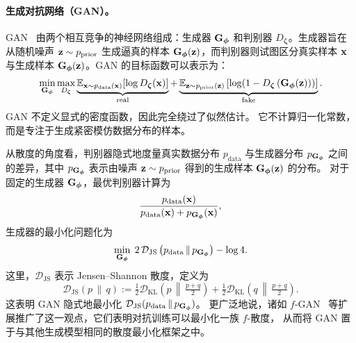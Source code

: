 \paragraph{生成对抗网络（GAN）。}
GAN~\citep{goodfellow2014generative} 由两个相互竞争的神经网络组成：生成器 $ {\mathbf{G}}_{\bm{\phi}} $ 和判别器 $ D_{\bm{\zeta}} $。生成器旨在从随机噪声 $ {\mathbf{z}} \sim p_{\mathrm{prior}}$ 生成逼真的样本 $ {\mathbf{G}}_{\bm{\phi}}({\mathbf{z}}) $，而判别器则试图区分真实样本 $ {\mathbf{x}} $ 与生成样本 $ {\mathbf{G}}_{\bm{\phi}}({\mathbf{z}}) $。GAN 的目标函数可以表示为：
\begin{equation*}
    \min_{{\mathbf{G}}_{\bm{\phi}}} \max_{D_{\bm{\zeta}}} \underbrace{\mathbb{E}_{{\mathbf{x}} \sim p_{\mathrm{data}}({\mathbf{x}})}[\log D_{\bm{\zeta}}({\mathbf{x}})]}_{\text{real}} + \underbrace{\mathbb{E}_{{\mathbf{z}} \sim p_{\mathrm{prior}}({\mathbf{z}})}\left[\log(1 - D_{\bm{\zeta}}\left({\mathbf{G}}_{\bm{\phi}}({\mathbf{z}}))\right)\right]}_{\text{fake}}.
\end{equation*}
GAN 不定义显式的密度函数，因此完全绕过了似然估计。
它不计算归一化常数，而是专注于生成紧密模仿数据分布的样本。

从散度的角度看，判别器隐式地度量真实数据分布 $p_{\mathrm{data}}$
与生成器分布 $p_{{\mathbf{G}}_{{\bm{\phi}}}}$ 之间的差异，其中 $p_{{\mathbf{G}}_{{\bm{\phi}}}}$ 表示由噪声 ${\mathbf{z}} \sim p_{\mathrm{prior}}$ 得到的生成样本 ${\mathbf{G}}_{{\bm{\phi}}}({\mathbf{z}})$ 的分布。
对于固定的生成器 ${\mathbf{G}}_{{\bm{\phi}}}$，最优判别器计算为
\begin{equation*}
     \frac{p_{\mathrm{data}}({\mathbf{x}})}{p_{\mathrm{data}}({\mathbf{x}}) + p_{{\mathbf{G}}_{{\bm{\phi}}}}({\mathbf{x}})},
\end{equation*}
生成器的最小化问题化为
\begin{equation*}
    \min_{{\mathbf{G}}_{{\bm{\phi}}}} \; 2\,\mathcal{D}_\mathrm{JS} \left(p_{\mathrm{data}} \,\|\, p_{{\mathbf{G}}_{\bm{\phi}}}\right) - \log 4.
\end{equation*}
这里，$\mathcal{D}_\mathrm{JS}$ 表示 Jensen–Shannon 散度，定义为
\begin{equation*}
    \mathcal{D}_\mathrm{JS}(p \,\|\, q) 
    := \tfrac{1}{2} \mathcal{D}_\mathrm{KL} \left(p \,\middle\|\, \tfrac{p+q}{2}\right) 
    + \tfrac{1}{2} \mathcal{D}_\mathrm{KL} \left(q \,\middle\|\, \tfrac{p+q}{2}\right).
\end{equation*}
这表明 GAN 隐式地最小化 $\mathcal{D}_\mathrm{JS}(p_{\mathrm{data}} \,\|\, p_{{\mathbf{G}}_{\bm{\phi}}})$。
更广泛地说，诸如 $f$-GAN~\citep{nowozin2016f} 等扩展推广了这一观点，它们表明对抗训练可以最小化一族 $f$-散度，
从而将 GAN 置于与其他生成模型相同的散度最小化框架之中。



